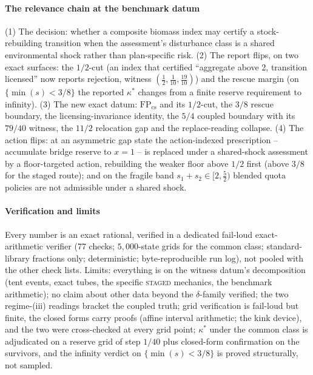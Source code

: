 \documentclass[preprint,11pt,authoryear]{elsarticle}
\theoremstyle{remark}
\newcommand{\act}[1]{\textsc{#1}}
\begin{document}
\paragraph{The relevance chain at the benchmark datum} (1) The decision: whether a composite biomass index may certify a stock-rebuilding transition when the assessment's disturbance class is a shared environmental shock rather than plan-specific risk. (2) The report flips, on two exact surfaces: the $1/2$-cut (an index that certified ``aggregate above 2, transition licensed'' now reports rejection, witness $(\tfrac12,\tfrac1{10},\tfrac{19}{10})$) and the rescue margin (on $\{\min(s)<3/8\}$ the reported $\kappa^*$ changes from a finite reserve requirement to infinity). (3) The new exact datum: $\mathrm{FP}_{\mathrm{cs}}$ and its $1/2$-cut, the $3/8$ rescue boundary, the licensing-invariance identity, the $5/4$ coupled boundary with its $79/40$ witness, the $11/2$ relocation gap and the replace-reading collapse. (4) The action flips: at an asymmetric gap state the action-indexed prescription -- accumulate bridge reserve to $x=1$ -- is replaced under a shared-shock assessment by a floor-targeted action, rebuilding the weaker floor above $1/2$ first (above $3/8$ for the staged route); and on the fragile band $s_1+s_2\in[2,\tfrac52)$ blended quota policies are not admissible under a shared shock.

\paragraph{Verification and limits} Every number is an exact rational, verified in a dedicated fail-loud exact-arithmetic verifier (77 checks; $5{,}000$-state grids for the common class; standard-library fractions only; deterministic; byte-reproducible run log), not pooled with the other check lists. Limits: everything is on the witness datum's decomposition (tent events, exact tubes, the specific \act{staged} mechanics, the benchmark arithmetic); no claim about other data beyond the $\delta$-family verified; the two regime-(iii) readings bracket the coupled truth; grid verification is fail-loud but finite, the closed forms carry proofs (affine interval arithmetic; the kink device), and the two were cross-checked at every grid point; $\kappa^*$ under the common class is adjudicated on a reserve grid of step $1/40$ plus closed-form confirmation on the survivors, and the infinity verdict on $\{\min(s)<3/8\}$ is proved structurally, not sampled.
\end{document}

